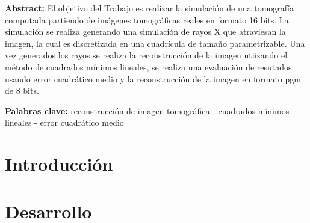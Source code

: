 \documentclass[10pt,a4paper]{article}
\begin{document}


\fecha{\today}



\maketitle
\par \textbf{Abstract:} El objetivo del Trabajo es realizar la simulación de una tomografía computada partiendo de imágenes tomográficas reales en formato 16 bits. La simulación se realiza generando una simulación de rayos X que atraviesan la imagen, la cual es discretizada en una cuadrícula de tamaño parametrizable. Una vez generados los rayos se realiza la reconstrucción de la imagen utiizando el método de cuadrados mínimos lineales, se realiza una evaluación de resutados usando error cuadrático medio y la reconstrucción de la imagen en formato pgm de 8 bits.

\par  \textbf{Palabras clave:} reconstrucción de imagen tomográfica - cuadrados mínimos lineales - error cuadrático medio
\tableofcontents


\newpage

\section{Introducción}

\newpage


\section{Desarrollo}

\newpage
\end{document}
